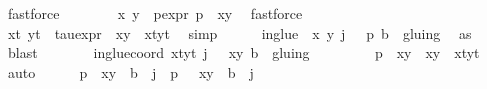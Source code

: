 \begin{isabellebody}
\ fastforce\ \ \isanewline
\ \ \ \ \isamarkupfalse%
\ x{\isacharprime}\ y{\isacharprime}\ \ p{\isacharunderscore}expr{\isacharcolon}\ {\isachardoublequoteopen}p\ {\isacharequal}\ {\isacharparenleft}x{\isacharprime}{\isacharcomma}y{\isacharprime}{\isacharparenright}{\isachardoublequoteclose}\ \isamarkupfalse%
\ fastforce\isanewline
\ \ \ \ \isamarkupfalse%
\ xt\ yt\ \ tau{\isacharunderscore}expr{\isacharcolon}\ {\isachardoublequoteopen}{\isasymtau}\ {\isacharparenleft}x{\isacharcomma}y{\isacharparenright}\ {\isacharequal}\ {\isacharparenleft}xt{\isacharcomma}yt{\isacharparenright}{\isachardoublequoteclose}\ \isamarkupfalse%
\ simp\isanewline
\ \ \ \ \isamarkupfalse%
\ in{\isacharunderscore}glue{\isacharcolon}\ {\isachardoublequoteopen}{\isacharparenleft}{\isacharparenleft}{\isasymtau}\ {\isacharparenleft}x{\isacharcomma}\ y{\isacharparenright}{\isacharcomma}\ j\ {\isacharplus}\ {}{\isacharparenright}{\isacharcomma}\ p{\isacharcomma}\ b{\isacharparenright}\ {\isasymin}\ gluing{\isachardoublequoteclose}\ \isamarkupfalse%
\ as\ \isamarkupfalse%
\ blast\isanewline
\ \ \ \ \isamarkupfalse%
\ \isamarkupfalse%
\ in{\isacharunderscore}glue{\isacharunderscore}coord{\isacharcolon}\ {\isachardoublequoteopen}{\isacharparenleft}{\isacharparenleft}{\isacharparenleft}xt{\isacharcomma}yt{\isacharparenright}{\isacharcomma}\ j\ {\isacharplus}\ {}{\isacharparenright}{\isacharcomma}\ {\isacharparenleft}x{\isacharprime}{\isacharcomma}y{\isacharprime}{\isacharparenright}{\isacharcomma}\ b{\isacharparenright}\ {\isasymin}\ gluing{\isachardoublequoteclose}\ \isanewline
\ \ \ \ \ \ \isamarkupfalse%
\ {\isacartoucheopen}p\ {\isacharequal}\ {\isacharparenleft}x{\isacharprime}{\isacharcomma}y{\isacharprime}{\isacharparenright}{\isacartoucheclose}\ {\isacartoucheopen}{\isasymtau}\ {\isacharparenleft}x{\isacharcomma}y{\isacharparenright}\ {\isacharequal}\ {\isacharparenleft}xt{\isacharcomma}yt{\isacharparenright}{\isacartoucheclose}\ \isamarkupfalse%
\ auto\isanewline
\ \ \ \ \isamarkupfalse%
\ {\isachardoublequoteopen}{\isacharparenleft}p\ {\isacharequal}\ {\isacharparenleft}x{\isacharcomma}y{\isacharparenright}\ {\isasymand}\ b\ {\isacharequal}\ j{\isacharparenright}\ {\isasymor}\ {\isacharparenleft}p\ {\isacharequal}\ {\isasymtau}\ {\isacharparenleft}x{\isacharcomma}y{\isacharparenright}\ {\isasymand}\ b\ {\isacharequal}\ j{\isacharplus}{}{\isacharparenright}{\isachardoublequoteclose}\isanewline

\end{isabellebody}
